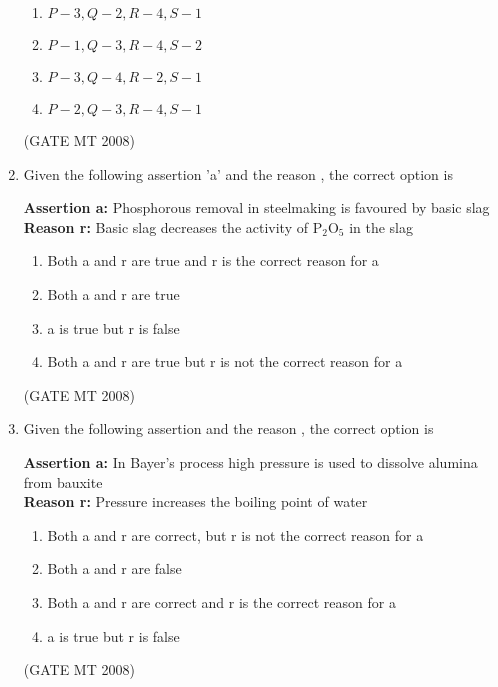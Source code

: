 \documentclass[journal, 11pt, onecolumn]{IEEEtran}
\theoremstyle{remark}
\begin{document}
\begin{enumerate}
\begin{multicols}{2}
\begin{enumerate} 
\item $P-3, Q-2, R-4, S-1$
\item $P-1, Q-3, R-4, S-2$
\item $P-3, Q-4, R-2, S-1$
\item $P-2, Q-3, R-4, S-1$
\end{enumerate}
\end{multicols}
\hfill(GATE MT 2008)

\item Given the following assertion 'a' and the reason , the correct option is

\textbf{Assertion a:} Phosphorous removal in steelmaking is favoured by basic slag \\
\textbf{Reason r:} Basic slag decreases the activity of P$_2$O$_5$ in the slag

\begin{multicols}{2}
\begin{enumerate} 
\item Both a and r are true and r is the correct reason for a
\item Both a and r are true
\item a is true but r is false
\item Both a and r are true but r is not the correct reason for a
\end{enumerate}
\end{multicols}
\hfill(GATE MT 2008)
\item Given the following assertion  and the reason , the correct option is

\textbf{Assertion a:} In Bayer's process high pressure is used to dissolve alumina from bauxite \\
\textbf{Reason r:} Pressure increases the boiling point of water

\begin{multicols}{2}
\begin{enumerate} 
\item Both a and r are correct, but r is not the correct reason for a
\item Both a and r are false
\item Both a and r are correct and r is the correct reason for a
\item a is true but r is false
\end{enumerate}
\end{multicols}
\hfill(GATE MT 2008) 


\end{enumerate}
\end{document}
